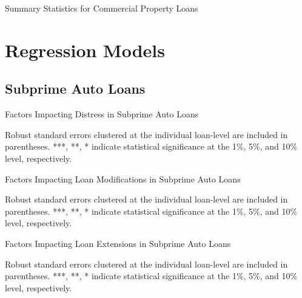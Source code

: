 \documentclass[10.5pt]{article}
\begin{document}
\newpage
\begin{table}[H]
    \begin{center}
  \caption{Summary Statistics for Commercial Property Loans}
    {\renewcommand\normalsize{\small}%
    \small
    }
    \end{center}
\end{table}


\newpage

\section{Regression Models}

\subsection{Subprime Auto Loans}
\begin{table}[H]
    \begin{center}
  \caption{Factors Impacting Distress in Subprime Auto Loans}
    {\renewcommand\normalsize{\small}%
    \footnotesize
    }
    \label{subprimedistress}
    \end{center}
\end{table}
\noindent\footnotesize{Robust standard errors clustered at the individual loan-level are included in parentheses. ***, **, * indicate statistical significance at the 1\%, 5\%, and 10\% level, respectively.}
\newpage

\begin{table}[H]
    \begin{center}
  \caption{Factors Impacting Loan Modifications in Subprime Auto Loans}
    {\renewcommand\normalsize{\small}%
    \footnotesize
    }
    \end{center}
    \label{tab:subprime_modification}
\end{table}
\noindent\footnotesize{Robust standard errors clustered at the individual loan-level are included in parentheses. ***, **, * indicate statistical significance at the 1\%, 5\%, and 10\% level, respectively.}
\newpage




\begin{table}[H]
    \begin{center}
  \caption{Factors Impacting Loan Extensions in Subprime Auto Loans}
    {\renewcommand\normalsize{\small}%
    \footnotesize
    }
    \end{center}
    \label{tab:subprime_extension}
\end{table}
\noindent\footnotesize{Robust standard errors clustered at the individual loan-level are included in parentheses. ***, **, * indicate statistical significance at the 1\%, 5\%, and 10\% level, respectively.}
\end{document}
